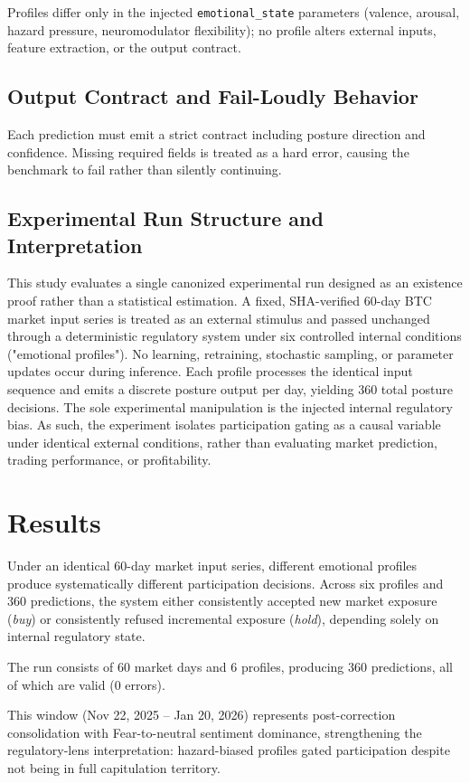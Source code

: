 \documentclass[12pt,a4paper]{article}
\begin{document}
Profiles differ only in the injected \texttt{emotional\_state} parameters (valence, arousal, hazard pressure, neuromodulator flexibility); no profile alters external inputs, feature extraction, or the output contract.

\subsection{Output Contract and Fail-Loudly Behavior}

Each prediction must emit a strict contract including posture direction and confidence. Missing required fields is treated as a hard error, causing the benchmark to fail rather than silently continuing.
\subsection{Experimental Run Structure and Interpretation}

This study evaluates a single canonized experimental run designed as an existence proof rather than a statistical estimation. A fixed, SHA-verified 60-day BTC market input series is treated as an external stimulus and passed unchanged through a deterministic regulatory system under six controlled internal conditions ("emotional profiles"). No learning, retraining, stochastic sampling, or parameter updates occur during inference. Each profile processes the identical input sequence and emits a discrete posture output per day, yielding 360 total posture decisions. The sole experimental manipulation is the injected internal regulatory bias. As such, the experiment isolates participation gating as a causal variable under identical external conditions, rather than evaluating market prediction, trading performance, or profitability.
\section{Results}

Under an identical 60-day market input series, different emotional profiles produce systematically different participation decisions. Across six profiles and 360 predictions, the system either consistently accepted new market exposure (\emph{buy}) or consistently refused incremental exposure (\emph{hold}), depending solely on internal regulatory state.

The run consists of 60 market days and 6 profiles, producing 360 predictions, all of which are valid (0 errors).

This window (Nov 22, 2025 – Jan 20, 2026) represents post-correction consolidation with Fear-to-neutral sentiment dominance, strengthening the regulatory-lens interpretation: hazard-biased profiles gated participation despite not being in full capitulation territory.
\end{document}
